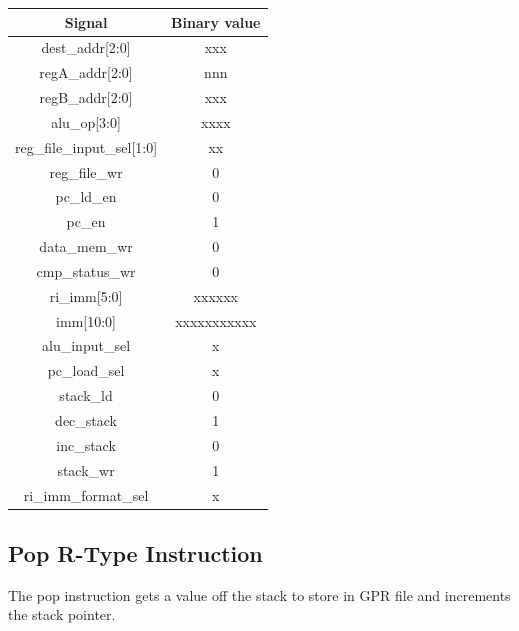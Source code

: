 \documentclass{article}
\begin{document}
\begin{par}
	\begin{center}
		\begin{tabular}{|c|c|}
			\hline 
			\textbf{Signal} & \textbf{Binary value} \\ 
			\hline 
			dest\_addr[2:0] & xxx \\ 
			\hline 
			regA\_addr[2:0] & nnn \\ 
			\hline 
			regB\_addr[2:0] & xxx \\ 
			\hline 
			alu\_op[3:0] & xxxx \\ 
			\hline 
			reg\_file\_input\_sel[1:0] & xx \\ 
			\hline 
			reg\_file\_wr & 0 \\ 
			\hline 
			pc\_ld\_en & 0 \\ 
			\hline 
			pc\_en & 1 \\ 
			\hline 
			data\_mem\_wr & 0 \\ 
			\hline 
			cmp\_status\_wr & 0 \\ 
			\hline 
			ri\_imm[5:0] & xxxxxx \\ 
			\hline 
			imm[10:0] & xxxxxxxxxxx \\ 
			\hline 
			alu\_input\_sel & x \\ 
			\hline 
			pc\_load\_sel & x \\ 
			\hline 
			stack\_ld & 0 \\ 
			\hline 
			dec\_stack & 1 \\ 
			\hline 
			inc\_stack & 0 \\ 
			\hline 
			stack\_wr & 1 \\ 
			\hline 
			ri\_imm\_format\_sel & x \\ 
			\hline 
		\end{tabular} 
	\end{center}

	\newpage
	\subsection{Pop R-Type Instruction}
	
	The pop instruction gets a value off the stack to store in GPR file and increments the stack pointer. 
	

\end{par}
\end{document}
